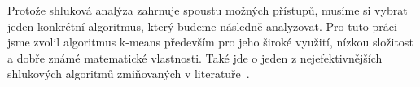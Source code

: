 

Protože shluková analýza zahrnuje spoustu možných přístupů, musíme si vybrat jeden konkrétní algoritmus, který budeme následně analyzovat. Pro tuto práci jsme zvolil algoritmus k-means především pro jeho široké využití, nízkou složitost a dobře známé matematické vlastnosti. Také jde o jeden z nejefektivnějších shlukových algoritmů zmiňovaných v literatuře~\cite{Aggarwal13}.\\

